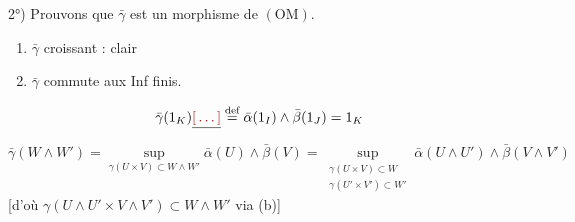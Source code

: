 \documentclass[11pt,a4paper]{article}
\begin{document}
2°) Prouvons que $\bar\gamma$ est un morphisme de $(\mathrm{OM})$.
\begin{enumerate}
  \item[$\alpha$)] $\bar\gamma$ croissant : clair
  \item[$\beta$)] $\bar\gamma$ commute aux Inf finis.
\end{enumerate}
\[
  \bar\gamma(1_K) \struck{\ill{}} \overset{\text{def}}{=} \bar\alpha(1_I) \wedge \bar\beta(1_J) = 1_K
\]
\[
  \bar\gamma(W \wedge W') = \sup_{\gamma(U \times V) \subset W \wedge W'} \bar\alpha(U) \wedge \bar\beta(V) = \sup_{\substack{\gamma(U \times V) \subset W \\ \gamma(U' \times V') \subset W'}} \bar\alpha(U \wedge U') \wedge \bar\beta(V \wedge V')
\]
[d'où $\gamma(U \wedge U' \times V \wedge V') \subset W \wedge W'$ via (b)]
\end{document}
